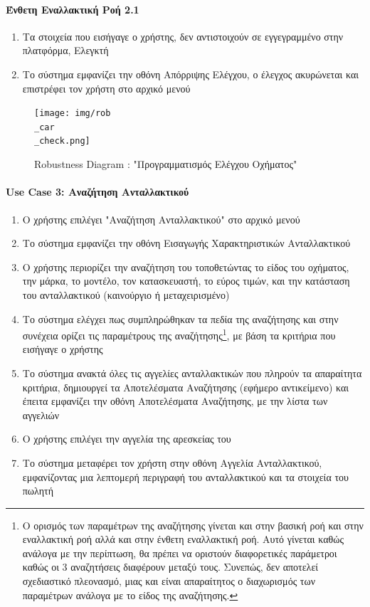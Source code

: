 \documentclass{../ol-softwaremanual}
\begin{document}
	\paragraph{Ένθετη Εναλλακτική Ροή 2.1}
	
	\begin{enumerate}
		\item Τα στοιχεία που εισήγαγε ο χρήστης, δεν αντιστοιχούν σε εγγεγραμμένο στην πλατφόρμα, Ελεγκτή
		\item Το σύστημα εμφανίζει την οθόνη Απόρριψης Ελέγχου, ο έλεγχος ακυρώνεται και επιστρέφει τον χρήστη στο αρχικό μενού
	\end{enumerate}
	
	
	\begin{figure}[htbp!]
		\texttt{[image: img/rob\\\_car\\\_check.png]}
		\caption{\en Robustness Diagram : "\gr Προγραμματισμός Ελέγχου Οχήματος\en"\gr}
	\end{figure}
	
	
	\newpage
	\centering
	
	\paragraph{\en Use Case 3: \gr Αναζήτηση Ανταλλακτικού}	
	
	\begin{enumerate}
		\item Ο χρήστης επιλέγει \en"\gr Αναζήτηση Ανταλλακτικού\en" \gr στο αρχικό μενού
		\item Το σύστημα εμφανίζει την οθόνη Εισαγωγής Χαρακτηριστικών Ανταλλακτικού
		\item Ο χρήστης περιορίζει την αναζήτηση του τοποθετώντας το είδος του οχήματος, την μάρκα, το μοντέλο, τον κατασκευαστή, το εύρος τιμών, και την κατάσταση του ανταλλακτικού (καινούργιο ή μεταχειρισμένο) 
		\item Το σύστημα ελέγχει πως συμπληρώθηκαν τα πεδία της αναζήτησης και στην συνέχεια ορίζει τις παραμέτρους της αναζήτησης\footnote[2]{Ο ορισμός των παραμέτρων της αναζήτησης γίνεται και στην βασική ροή και στην εναλλακτική ροή αλλά και στην ένθετη εναλλακτική ροή. Αυτό γίνεται καθώς ανάλογα με την περίπτωση, θα πρέπει να οριστούν διαφορετικές παράμετροι καθώς οι 3 αναζητήσεις διαφέρουν μεταξύ τους. Συνεπώς, δεν αποτελεί σχεδιαστικό πλεονασμό, μιας και είναι απαραίτητος ο διαχωρισμός των παραμέτρων ανάλογα με το είδος της αναζήτησης.}, με βάση τα κριτήρια που εισήγαγε ο χρήστης
		\item Το σύστημα ανακτά όλες τις αγγελίες ανταλλακτικών που πληρούν τα απαραίτητα κριτήρια, δημιουργεί τα Αποτελέσματα Αναζήτησης (εφήμερο αντικείμενο) και έπειτα εμφανίζει την οθόνη Αποτελέσματα Αναζήτησης, με την λίστα των αγγελιών
		\item Ο χρήστης επιλέγει την αγγελία της αρεσκείας του
		\item Το σύστημα μεταφέρει τον χρήστη στην οθόνη Αγγελία Ανταλλακτικού, εμφανίζοντας μια λεπτομερή περιγραφή του ανταλλακτικού και τα στοιχεία του πωλητή		
	\end{enumerate}
	
\end{document}
